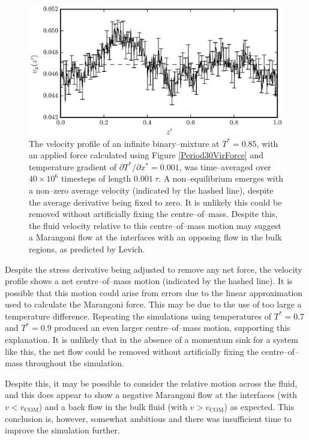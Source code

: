 \begin{figure}[h!]
\centering
\includegraphics[scale=1.0]{Period30VirFlow}
\caption{The velocity profile of an infinite binary--mixture at $T^{*}=0.85$, with an applied force calculated using Figure \ref{Period30VirForce} and temperature gradient of $\partial T^{*} / \partial x^{*} = 0.001$, was time--averaged over $40 \times 10^{6}$ timesteps of length $0.001\ \tau$.
A non--equilibrium emerges with a non--zero average velocity (indicated by the hashed line), despite the average derivative being fixed to zero.
It is unlikely this could be removed without artificially fixing the centre--of--mass.
Despite this, the fluid velocity relative to this centre--of--mass motion may suggest a Marangoni flow at the interfaces with an opposing flow in the bulk regions, as predicted by Levich.\cite{Levich}
}
\label{Period30VirFlow}
\end{figure}

Despite the stress derivative being adjusted to remove any net force, the velocity profile shows a net centre--of--mass motion (indicated by the hashed line).
It is possible that this motion could arise from errors due to the linear approximation used to calculate the Marangoni force.
This may be due to the use of too large a temperature difference.
Repeating the simulations using temperatures of $T^{*}=0.7$ and $T^{*}=0.9$ produced an even larger centre--of--mass motion, supporting this explanation.
It is unlikely that in the absence of a momentum sink for a system like this, the net flow could be removed without artificially fixing the centre--of--mass throughout the simulation.

Despite this, it may be possible to consider the relative motion across the fluid, and this does appear to show a negative Marangoni flow at the interfaces (with $v < v_{\mathrm{COM}}$) and a back flow in the bulk fluid (with $v > v_{\mathrm{COM}}$) as expected. 
This conclusion is, however, somewhat ambitious and there was insufficient time to improve the simulation further.

